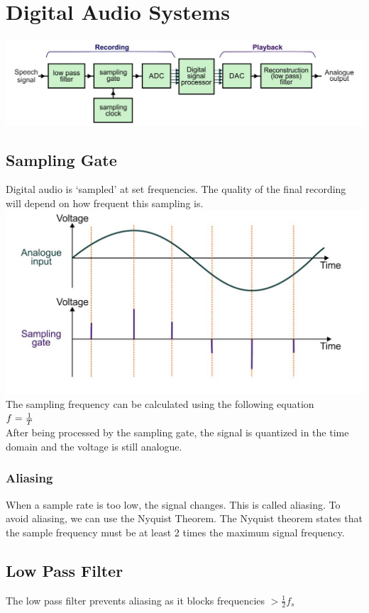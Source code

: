 \documentclass[a4paper,11pt, twocolumn]{article}
\begin{document}
\section{Digital Audio Systems}
\includegraphics[width=\linewidth]{digitalAudioSystemBD.jpg}
\subsection{Sampling Gate}
Digital audio is `sampled' at set frequencies. The quality of the final recording will depend on how frequent this sampling is. 
\includegraphics[width=\linewidth]{dasSamplingGate.jpg}
The sampling frequency can be calculated using the following equation\\
$f = \frac{1}{T} \displaystyle$\\
After being processed by the sampling gate, the signal is quantized in the time domain and the voltage is still analogue. 
\subsubsection{Aliasing}
When a sample rate is too low, the signal changes. This is called aliasing. To avoid aliasing, we can use the Nyquist Theorem. The Nyquist theorem states that the sample frequency must be at least 2 times the maximum signal frequency.
\subsection{Low Pass Filter}
The low pass filter prevents aliasing as it blocks frequencies $> \frac{1}{2}f_s$
\end{document}
